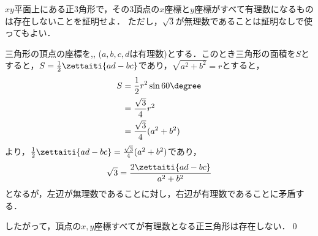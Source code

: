 
\begin{problem}
$xy$平面上にある正3角形で，その3頂点の$x$座標と$y$座標がすべて有理数になるものは存在しないことを証明せよ．
ただし，$\sqrt3$が無理数であることは証明なしで使ってもよい．
\end{problem}

三角形の頂点の座標を,, ($a,b,c,d$は有理数)とする．このとき三角形の面積を$S$とすると，$S = \frac12 \zettaiti{ad -bc}$であり，$\sqrt{a^2+b^2} = r$とすると，
\begin{align*}
  S &= \frac12 r^2 \sin 60\degree \\
  &= \frac{\sqrt3}{4}r^2 \\
  &= \frac{\sqrt3}{4}(a^2 +b^2)
\end{align*}
より，$\frac{1}{2}\zettaiti{ ad - bc } = \frac{\sqrt3}{4}(a^2+b^2)$であり，
\[\sqrt3 = \frac{2\zettaiti{ad-bc}}{a^2+b^2}\]
となるが，左辺が無理数であることに対し，右辺が有理数であることに矛盾する．

したがって，頂点の$x,y$座標すべてが有理数となる正三角形は存在しない．\qed

